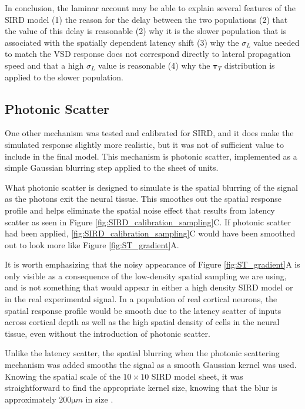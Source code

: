 \documentclass[phd,ianc,twoside]{infthesis}
\begin{document}
In conclusion, the laminar account may be able to explain several
features of the SIRD model (1) the reason for the delay between the two
populations (2) that the value of this delay is reasonable (2) why it is
the slower population that is associated with the spatially dependent
latency shift (3) why the $\sigma_L$ value needed to match the VSD
response does not correspond directly to lateral propagation speed and
that a high $\sigma_L$ value is reasonable (4) why the $\pmb{\tau}_T$
distribution is applied to the slower population.

\subsection{Photonic Scatter}
\label{section:photonic_scatter}

One other mechanism was tested and calibrated for SIRD, and it does
make the simulated response slightly more realistic, but it was not of
sufficient value to include in the final model. This mechanism is
photonic scatter, implemented as a simple Gaussian blurring step
applied to the sheet of units.

What photonic scatter is designed to simulate is the spatial blurring of
the signal as the photons exit the neural tissue. This smoothes out the
spatial response profile and helps eliminate the spatial noise effect
that results from latency scatter as seen in Figure
\ref{fig:SIRD_calibration_sampling}C. If photonic scatter had been
applied, \ref{fig:SIRD_calibration_sampling}C would have been smoothed
out to look more like Figure \ref{fig:ST_gradient}A.

It is worth emphasizing that the noisy appearance of Figure
\ref{fig:ST_gradient}A is only visible as a consequence of the
low-density spatial sampling we are using, and is not something that
would appear in either a high density SIRD model or in the real
experimental signal. In a population of real cortical neurons, the
spatial response profile would be smooth due to the latency scatter of
inputs across cortical depth as well as the high spatial density of
cells in the neural tissue, even without the introduction of photonic
scatter.

Unlike the latency scatter, the spatial blurring when the photonic
scattering mechanism was added smooths the signal as a smooth Gaussian
kernel was used. Knowing the spatial scale of the $10\times10$ SIRD
model sheet, it was straightforward to find the appropriate kernel size,
knowing that the blur is approximately $200 \si{\micro m}$ in size
\citep{orbach_jn83}.
\end{document}
